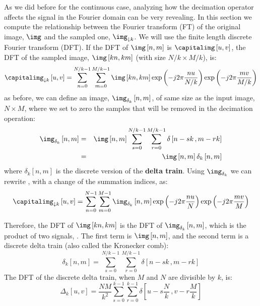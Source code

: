 As we did before for the continuous case, analyzing how the decimation operator affects the signal in the Fourier domain can be very revealing. 
In this section we compute the relationship between the Fourier transform (FT) of the original image, $\img$ and the sampled one, $\img_{\downarrow k}$. We will use the finite length discrete Fourier transform (DFT). If the DFT of $\img \left[n,m\right]$ is $\capitalimg \left[u,v\right]$, the DFT of the sampled image, $\img \left[kn,km\right]$ (with size $N/k \times M/k$), is:
\begin{equation}
\capitalimg_{\downarrow k} \left[u,v\right]   = \sum_{n=0}^{N/k-1} \sum_{m=0}^{M/k-1} \img \left[kn,km\right] \exp{ \left(  -j2\pi \frac{nu}{N/k} \right)}  \exp{ \left(  -j2\pi \frac{mv}{M/k} \right)}
\label{eq:down1}
\end{equation}
as before, we can define an image, $\img_{\delta_k} \left[n,m\right]$, of same size as the input image, $N \times M$, where we set to zero the samples that will be removed in the decimation operation:
\begin{eqnarray}
\img_{\delta_k} \left[n,m\right] &=& \img \left[n,m\right] \sum_{s=0}^{N/k-1} \sum_{r=0}^{M/k-1} \delta \left[n - sk \, ,m - rk \right] \\
&=&  \img \left[n,m\right]  \delta_k \left[n,m\right] 
\label{eq:down2}
\end{eqnarray}
where $\delta_k \left[n,m\right]$ is the discrete version of the {\bf delta train}. Using $\img_{\delta_k}$ we can rewrite \eqn{\ref{eq:down1}}, with a change of the summation indices, as:
\begin{equation}
\capitalimg_{\downarrow k} \left[u,v\right]   = \sum_{n=0}^{N-1} \sum_{m=0}^{M-1} \img_{\delta_k} \left[n,m\right] \exp{ \left(  -j2\pi \frac{nu}{N} \right)}  \exp{ \left(  -j2\pi \frac{mv}{M} \right)}
\end{equation}

Therefore, the DFT of $\img\left[kn,km\right]$ is the DFT of $\img_{\delta_k} \left[n,m\right]$, which is the product of two signals, \eqn{\ref{eq:down2}}. The first term is $\img \left[n,m\right]$, and the second term is a discrete delta train (also called the Kronecker comb): 
\begin{equation}
\delta_k \left[n,m\right]  =  \sum_{s=0}^{N/k-1} \sum_{r=0}^{M/k-1} \delta \left[n - sk \, ,m - rk \right]
\end{equation}
The DFT of the discrete delta train, when $M$ and $N$ are divisible by $k$, is:
\begin{equation}
\Delta_k \left[u,v\right]  = \frac{NM}{k^2}  \sum_{s=0}^{k-1} \sum_{r=0}^{k-1} \delta \left[u - s\frac{N}{k} \, ,v - r\frac{M}{k} \right]
\end{equation}

